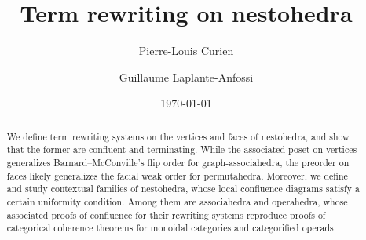 \documentclass[11pt]{amsart}
\title{Term rewriting on nestohedra}
\author{Pierre-Louis Curien}
\author{Guillaume Laplante-Anfossi}
\date{\today}
\begin{document}
\begin{abstract}
We define term rewriting systems on the vertices and faces of nestohedra, and show that the former are  
confluent and terminating. 
While the associated poset on vertices generalizes Barnard--McConville's flip order for graph-associahedra, the preorder on faces likely generalizes the facial weak order for permutahedra. 
Moreover, we define and study contextual families of nestohedra, whose local confluence diagrams satisfy a certain uniformity condition. 
Among them are associahedra and operahedra, whose associated proofs of confluence for their rewriting systems reproduce proofs of categorical coherence theorems for monoidal categories and categorified operads.
\end{abstract}

\maketitle

\setcounter{tocdepth}{1}





%

%
\bigskip





\end{document}
